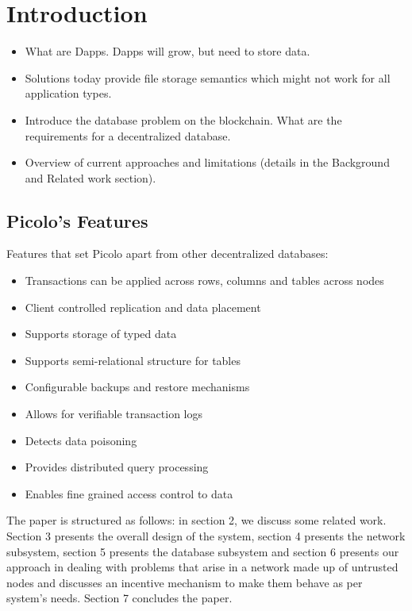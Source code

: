 \documentclass[preprint,12pt]{elsarticle}
\begin{document}
\section{Introduction}\label{Sect:Introduction}


    \begin{itemize}
        \item What are Dapps. Dapps will grow, but need to store data.
        \item Solutions today provide file storage semantics which might not work for all application types.
        \item Introduce the database problem on the blockchain. What are the requirements for a decentralized database.
        \item Overview of current approaches and limitations (details in the Background and Related work section).
    \end{itemize}


\subsection{Picolo's Features}
Features that set Picolo apart from other decentralized databases:
\begin{itemize}
	\item Transactions can be applied across rows, columns and tables across nodes
	\item Client controlled replication and data placement
	\item Supports storage of typed data
	\item Supports semi-relational structure for tables
	\item Configurable backups and restore mechanisms
	\item Allows for verifiable transaction logs
	\item Detects data poisoning
	\item Provides distributed query processing
	\item Enables fine grained access control to data
\end{itemize}
The paper is structured as follows: in section 2, we discuss some related work. Section 3 presents the overall design of the system, section 4 presents the network subsystem, section 5 presents the database subsystem and section 6 presents our approach in dealing with problems that arise in a network made up of untrusted nodes and discusses an incentive mechanism to make them behave as per system's needs. Section 7 concludes the paper.
\end{document}
